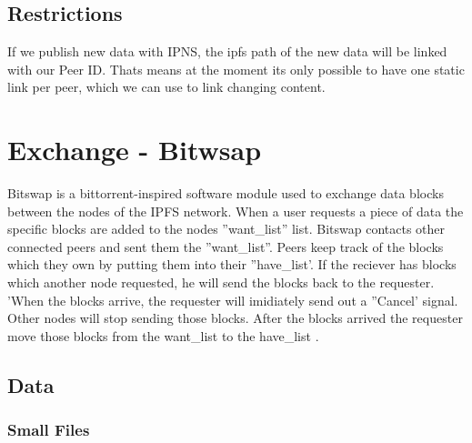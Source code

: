\documentclass[a4paper,11pt, oneside]{report}
\theoremstyle{definition}
\begin{document}
\subsection{Restrictions}
If we publish new data with IPNS, the ipfs path of the new data will be linked with our Peer ID. Thats means at the moment its only possible to have one static link per peer, which we can use to link changing content.



\newpage

\section{Exchange - Bitwsap}
Bitswap is a bittorrent-inspired software module used to exchange data blocks between the nodes of the IPFS network. When a user requests a piece of data the specific blocks are added to the nodes ''want\_list'' list. Bitswap contacts other connected peers and sent them the ''want\_list''. Peers keep track of the blocks which they own by putting them into their ''have\_list'. If the reciever has blocks which another node requested, he will send the blocks back to the requester. 'When the blocks arrive, the requester will imidiately send out a ''Cancel' signal. Other nodes will stop sending those blocks. After the blocks arrived the requester move those blocks from the want\_list to the have\_list  \cite{bitswap}.
\subsection{Data}
\subsubsection{Small Files}
\end{document}
